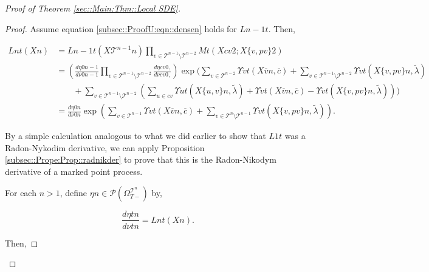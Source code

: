 \documentclass[12pt]{article}
\newcommand{\mc}{\mathcal}
\newcommand{\ov}{\overline}
\newcommand{\ind}{\hspace{24pt}}
\newcommand{\pmsr}{\mc{P}}							%
\renewcommand{\v}{v}							%
\newcommand{\vv}{u}								%
\newcommand{\T}{T}								%
\renewcommand{\t}{t}							%
\newcommand{\sset}{\Omega}						%
\newcommand{\X}{X}								%
\newcommand{\vsi}[1]{^{#1}}						%
\newcommand{\cl}{\ov}							%
\newcommand{\ts}[1]{_{#1}}						%
\newcommand{\IGrg}{\ov{c}}						%
\newcommand{\tree}{\mc{T}}						%
\newcommand{\sln}[1]{^{#1}}						%
\newcommand{\alt}[1]{\widetilde{#1}}			%
\newcommand{\mm}{\nu}							%
\newcommand{\mmm}{\eta}							%
\newcommand{\crate}{\alt{\lambda}}				%
\newcommand{\dense}{L}							%
\newcommand{\cdense}{M}							%
\newcommand{\ds}{\Upsilon}						%
\renewcommand{\c}{c}							%
\newcommand{\p}{p}								%
\begin{document}
\begin{proof}[Proof of Theorem \ref{sec::Main:Thm::Local SDE}]
\begin{proof}
Assume equation \eqref{subsec::ProofU:eqn::densen} holds for \(\dense{n-1}{\t}\). Then,

\begin{align*}
\dense{n}{\t}(\X{}{}{n}) &= \dense{n-1}{\t}(\X{\tree\sln{n-1}}{}{n})\prod_{\v\in\tree\sln{n-1}\setminus\tree\sln{n-2}} \cdense{}{\t}(\X{\c{\v}}{}{2};\X{\{\v,\p{\v}\}}{}{2})\\
&=\left(\frac{d\mmm{}{0}{n-1}}{d\mm{}{0}{n-1}}\prod_{\v\in\tree\sln{n-1}\setminus\tree\sln{n-2}}\frac{d\mmm{\c{\v}}{0,}{}}{d\mm{\c{\v}}{0,}{}}\right)\exp\Bigg(\sum_{\v\in\tree\sln{n-2}}\ds{\v}{\t}(\X{\cl{\v}}{}{n},\IGrg{}) + \sum_{\v\in\tree\sln{n-1}\setminus\tree\sln{n-2}} \ds{\v}{\t}(\X{\{\v,\p{\v}\}}{}{n},\crate{}{})\\
&\ind + \sum_{\v\in\tree\sln{n-1}\setminus\tree\sln{n-2}}\left(\sum_{\vv\in \c{\v}} \ds{\vv}{\t}(\X{\{\vv,\v\}}{}{n},\crate{}{}) + \ds{\v}{\t}(\X{\cl{\v}}{}{n},\IGrg{}) - \ds{\v}{\t}(\X{\{\v,\p{\v}\}}{}{n},\crate{}{})\right)\Bigg)\\
&=\frac{d\mmm{}{0}{n}}{d\mm{}{0}{n}}\exp\left(\sum_{\v\in\tree\sln{n-1}}\ds{\v}{\t}(\X{\cl{\v}}{}{n},\IGrg{}) + \sum_{\v\in\tree\sln{n}\setminus\tree\sln{n-1}} \ds{\v}{\t}(\X{\{\v,\p{\v}\}}{}{n},\crate{}{})\right).
\end{align*}

By a simple calculation analogous to what we did earlier to show that \(\dense{1}{\t}\) was a Radon-Nykodim derivative, we can apply Proposition \ref{subsec::Prope:Prop::radnikder} to prove that this is the Radon-Nikodym derivative of a marked point process. 

\ind For each \(n > 1\), define \(\mmm{}{}{n} \in \pmsr(\sset\vsi{\tree\sln{n}}\ts{\T-})\) by,

\[\frac{d\mmm{}{\t}{n}}{d\mm{}{\t}{n}} = \dense{n}{\t}(\X{}{}{n}).\]

Then,


\end{proof}
\end{proof}
\end{document}

